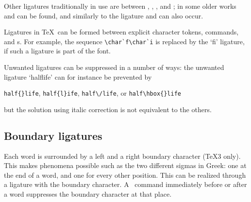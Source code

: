 Other ligatures traditionally in use are
between , , , and ;
in some older works  and  can be found,
and similarly to the  ligature  and 
can also occur.

Ligatures in \TeX\ can be formed between explicit character
tokens,  commands, and s.
For example,
the sequence \verb-\char`f\char`i- is replaced by the
`fi' ligature, if such a ligature is part of the font.

Unwanted ligatures can be suppressed in a number of ways:
the unwanted ligature `\hbox{halflife}' can 
for instance be prevented by
\begin{disp} \verb>half{}life>, \verb>half{l}ife>, \verb>half\/life>,
      or \verb>half\hbox{}life>\end{disp}
but the solution using italic correction is not equivalent
to the others.

\subsection{Boundary ligatures}

Each word is surrounded by a left and a right
boundary character (\TeX3 only).
This makes phenomena possible
such as the two different sigmas in Greek:
one at the end of a word, and one for every other position.
This can be realized through a ligature with the
boundary character. A~ command immediately
before or after a word suppresses the boundary character
at that place.

